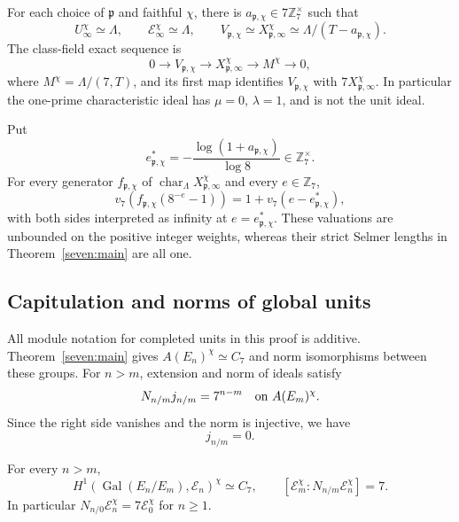 \begin{theorem}\label{seven:one-prime-linear}
For each choice of $\mathfrak p$ and faithful $\chi$, there is
$a_{\mathfrak p,\chi}\in7\mathbb Z_7^\times$ such that
\[
 U_\infty^\chi\simeq\Lambda,\qquad
 \mathcal E_\infty^\chi\simeq\Lambda,\qquad
 V_{\mathfrak p,\chi}\simeq
 X_{\mathfrak p,\infty}^\chi
 \simeq\Lambda/(T-a_{\mathfrak p,\chi}).
\]
The class-field exact sequence is
\begin{equation*}\tag{U1}\label{seven:one-prime-exact}
 0\longrightarrow V_{\mathfrak p,\chi}
 \longrightarrow X_{\mathfrak p,\infty}^\chi
 \longrightarrow M^\chi
 \longrightarrow0,
\end{equation*}
where $M^\chi=\Lambda/(7,T)$, and its first map identifies
$V_{\mathfrak p,\chi}$ with $7X_{\mathfrak p,\infty}^\chi$.
In particular the one-prime characteristic ideal has
$\mu=0$, $\lambda=1$, and is not the unit ideal.

Put
\[
 e_{\mathfrak p,\chi}^{*}
 =-\frac{\log(1+a_{\mathfrak p,\chi})}{\log8}
 \in\mathbb Z_7^\times.
\]
For every generator $f_{\mathfrak p,\chi}$ of
$\operatorname{char}_{\Lambda}X_{\mathfrak p,\infty}^\chi$ and every
$e\in\mathbb Z_7$,
\begin{equation*}\tag{U2}\label{seven:one-prime-weight-valuation}
 v_7\!\left(f_{\mathfrak p,\chi}(8^{-e}-1)\right)
 =1+v_7(e-e_{\mathfrak p,\chi}^{*}),
\end{equation*}
with both sides interpreted as infinity at
$e=e_{\mathfrak p,\chi}^{*}$. These valuations are unbounded on the
positive integer weights, whereas their strict Selmer lengths in
Theorem~\ref{seven:main} are all one.
\end{theorem}

\subsection{Capitulation and norms of global units}

All module notation for completed units in this proof is additive.
Theorem~\ref{seven:main} gives
$A(E_n)^\chi\simeq C_7$ and norm isomorphisms between these groups.
For $n>m$, extension and norm of ideals satisfy
\[
 N_{n/m}j_{n/m}=7^{n-m}
 \quad\hbox{on } A(E_m)^\chi.
\]
Since the right side vanishes and the norm is injective, we have
\begin{equation*}\tag{U3}\label{seven:faithful-capitulation}
 j_{n/m}=0.
\end{equation*}

\begin{lemma}\label{seven:unit-norm-index}
For every $n>m$,
\[
 H^1(\operatorname{Gal}(E_n/E_m),\mathcal E_n)^\chi\simeq C_7,
 \qquad
 [\mathcal E_m^\chi:N_{n/m}\mathcal E_n^\chi]=7.
\]
In particular
$N_{n/0}\mathcal E_n^\chi=7\mathcal E_0^\chi$ for $n\ge1$.
\end{lemma}

